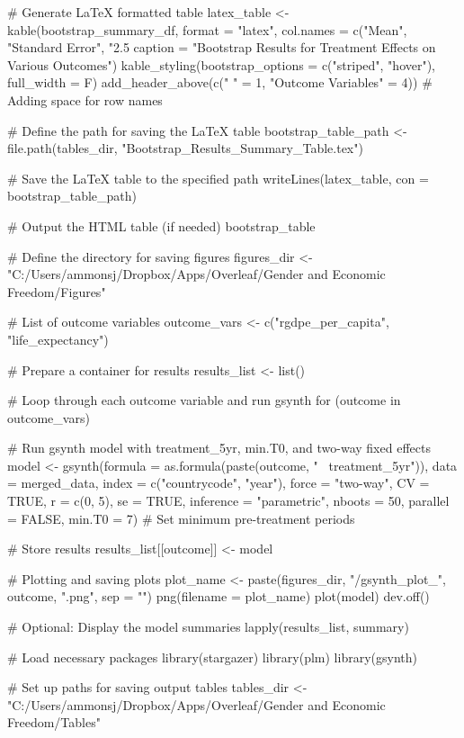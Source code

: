 # Generate LaTeX formatted table
latex_table <- kable(bootstrap_summary_df, format = "latex",
                     col.names = c("Mean", "Standard Error", "2.5%
                     caption = "Bootstrap Results for Treatment Effects on Various Outcomes") %
  kable_styling(bootstrap_options = c("striped", "hover"), full_width = F) %
  add_header_above(c(" " = 1, "Outcome Variables" = 4))  # Adding space for row names

# Define the path for saving the LaTeX table
bootstrap_table_path <- file.path(tables_dir, "Bootstrap_Results_Summary_Table.tex")

# Save the LaTeX table to the specified path
writeLines(latex_table, con = bootstrap_table_path)

# Output the HTML table (if needed)
bootstrap_table

# Define the directory for saving figures
figures_dir <- "C:/Users/ammonsj/Dropbox/Apps/Overleaf/Gender and Economic Freedom/Figures"

# List of outcome variables
outcome_vars <- c("rgdpe_per_capita", "life_expectancy")

# Prepare a container for results
results_list <- list()

# Loop through each outcome variable and run gsynth
for (outcome in outcome_vars) {
  # Run gsynth model with treatment_5yr, min.T0, and two-way fixed effects
  model <- gsynth(formula = as.formula(paste(outcome, "~ treatment_5yr")),
                  data = merged_data,
                  index = c("countrycode", "year"),
                  force = "two-way",
                  CV = TRUE,
                  r = c(0, 5),
                  se = TRUE,
                  inference = "parametric",
                  nboots = 50,
                  parallel = FALSE,
                  min.T0 = 7)  # Set minimum pre-treatment periods

  # Store results
  results_list[[outcome]] <- model

  # Plotting and saving plots
  plot_name <- paste(figures_dir, "/gsynth_plot_", outcome, ".png", sep = "")
  png(filename = plot_name)
  plot(model)
  dev.off()
}

# Optional: Display the model summaries
lapply(results_list, summary)

# Load necessary packages
library(stargazer)
library(plm)
library(gsynth)

# Set up paths for saving output tables
tables_dir <- "C:/Users/ammonsj/Dropbox/Apps/Overleaf/Gender and Economic Freedom/Tables"

